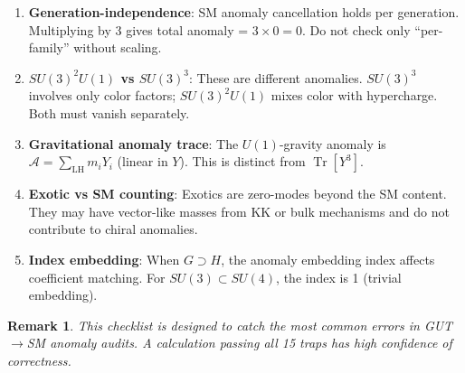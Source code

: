 \documentclass[11pt,a4paper]{article}
\newtheorem{remark}[theorem]{Remark}
\DeclareMathOperator{\Tr}{Tr}
\begin{document}
\begin{enumerate}[label=\textbf{T\arabic*.}, leftmargin=2cm]
\item \textbf{Generation-independence}: SM anomaly cancellation holds per generation. Multiplying by 3 gives total anomaly = $3 \times 0 = 0$. Do not check only ``per-family'' without scaling.

\item \textbf{$SU(3)^2 U(1)$ vs $SU(3)^3$}: These are different anomalies. $SU(3)^3$ involves only color factors; $SU(3)^2 U(1)$ mixes color with hypercharge. Both must vanish separately.

\item \textbf{Gravitational anomaly trace}: The $U(1)$-gravity anomaly is $\mathcal{A} = \sum_{\text{LH}} m_i Y_i$ (linear in $Y$). This is distinct from $\Tr[Y^3]$.

\item \textbf{Exotic vs SM counting}: Exotics are zero-modes beyond the SM content. They may have vector-like masses from KK or bulk mechanisms and do not contribute to chiral anomalies.

\item \textbf{Index embedding}: When $G \supset H$, the anomaly embedding index affects coefficient matching. For $SU(3) \subset SU(4)$, the index is 1 (trivial embedding).

\end{enumerate}

\begin{remark}
This checklist is designed to catch the most common errors in GUT$\to$SM anomaly audits. A calculation passing all 15 traps has high confidence of correctness.
\end{remark}

\end{document}
